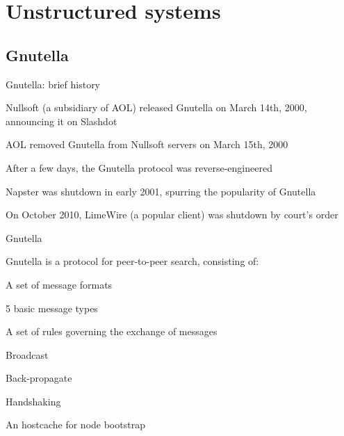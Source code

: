 \section{Unstructured systems}

\subsection{Gnutella}

\begin{frame}{Gnutella: brief history}
	
\BIL
\item Nullsoft (a subsidiary of AOL) released Gnutella on March 14th, 2000,
  announcing it on Slashdot
\item AOL removed Gnutella from Nullsoft servers on March 15th, 2000
\item After a few days, the Gnutella protocol was reverse-engineered
\item Napster was shutdown in early 2001, spurring the popularity of Gnutella
\item On October 2010, LimeWire (a popular client) was shutdown by court's order
\EIL

\end{frame}


\begin{frame}{Gnutella}
	
Gnutella is a protocol for peer-to-peer \alert{search}, consisting of:\\
\BIL
\item A set of message formats 
	\BI
	\item 5 basic message types
	\EI
\item A set of rules governing the exchange of messages
	\BI
	\item Broadcast
	\item Back-propagate
	\item Handshaking
	\EI
\item An \alert{hostcache} for node bootstrap
\EIL

\end{frame}


